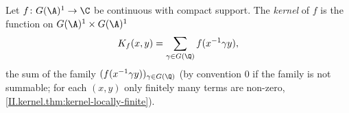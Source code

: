 Let $f\colon G(\A)^1\to\C$ be continuous with compact support. The \emph{kernel} of $f$ is the function on
$G(\A)^1\times G(\A)^1$
\[
  K_f(x,y)=\sum_{\gamma\in G(\Q)}f(x^{-1}\gamma y),
\]
the sum of the family $(f(x^{-1}\gamma y))_{\gamma\in G(\Q)}$ (by convention $0$ if the family is not summable; for each $(x,y)$ only
finitely many terms are non-zero, \cref{II.kernel.thm:kernel-locally-finite}).
